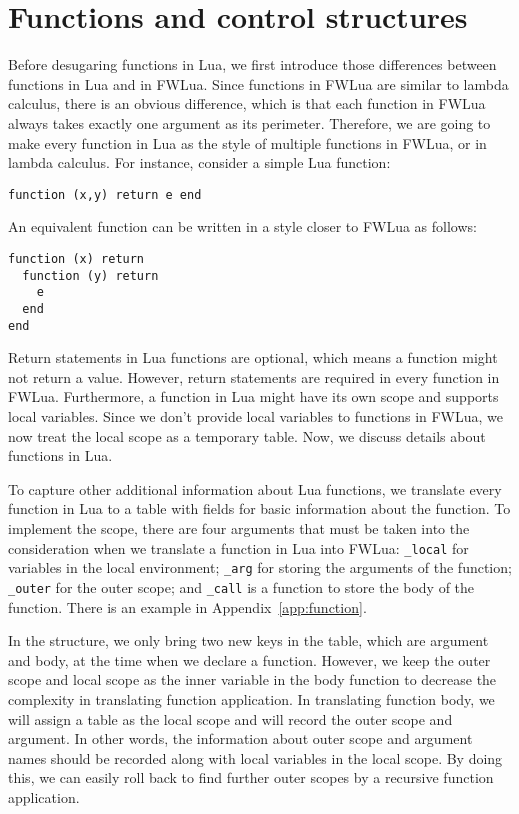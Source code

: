 \section{Functions and control structures}\label{sec:TraFunc}
Before desugaring functions in Lua, we first introduce those differences between functions in Lua and in FWLua. Since functions in FWLua are similar to lambda calculus, there is an obvious difference, which is that each function in FWLua always takes exactly one argument as its perimeter. Therefore, we are going to make every function in Lua as the style of multiple functions in FWLua, or in lambda calculus. For instance, consider a simple Lua function:

\begin{verbatim}
function (x,y) return e end
\end{verbatim}

An equivalent function can be written in a style closer to FWLua as follows:

\begin{verbatim}
function (x) return 
  function (y) return 
    e
  end
end
\end{verbatim}

Return statements in Lua functions are optional, which means a function might not return a value. However, return statements are required in every function in FWLua.
Furthermore, a function in Lua might have its own scope and supports local variables. 
Since we don't provide local variables to functions in FWLua, we now treat the local scope as a temporary table.
Now, we discuss details about functions in Lua.

To capture other additional information about Lua functions, we translate every function in Lua to a table with fields for basic information about the function. To implement the scope, there are four arguments that must be taken into the consideration when we translate a function in Lua into FWLua: {\tt \_local} for variables in the local environment; {\tt \_arg} for storing the arguments of the function; {\tt \_outer} for the outer scope; and {\tt \_call} is a function to store the body of the function. There is an example in Appendix~\ref{app:function}.

In the structure, we only bring two new keys in the table, which are argument and body, at the time when we declare a function. However, we keep the outer scope and local scope as the inner variable in the body function to decrease the complexity in translating function application. In translating function body, we will assign a table as the local scope and will record the outer scope and argument. In other words, the information about outer scope and argument names should be recorded along with local variables in the local scope. By doing this, we can easily roll back to find further outer scopes by a recursive function application.

